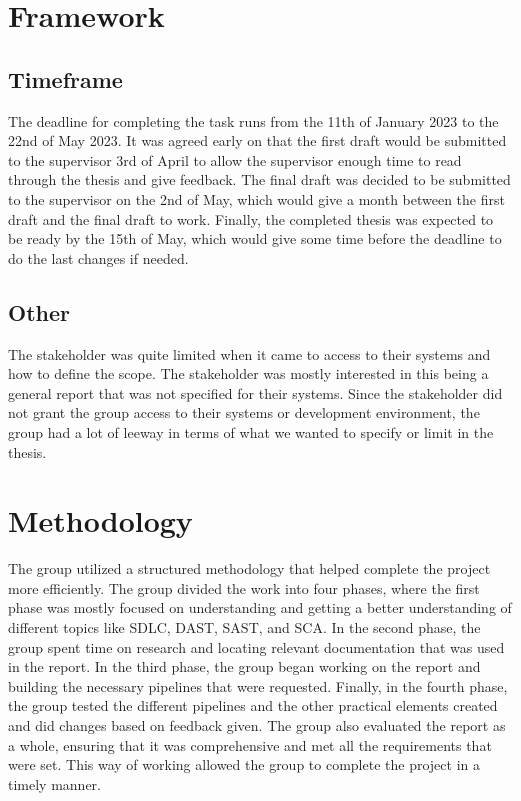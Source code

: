 \newpage
\section{Framework}

\subsection{Timeframe}
The deadline for completing the task runs from the 11th of January 2023 to the 22nd of May 2023. It was agreed early on that the first draft would be submitted to the supervisor 3rd of April to allow the supervisor enough time to read through the thesis and give feedback. The final draft was decided to be submitted to the supervisor on the 2nd of May, which would give a month between the first draft and the final draft to work. Finally, the completed thesis was expected to be ready by the 15th of May, which would give some time before the deadline to do the last changes if needed. 



\subsection{Other}
The stakeholder was quite limited when it came to access to their systems and how to define the scope. The stakeholder was mostly interested in this being a general report that was not specified for their systems. Since the stakeholder did not grant the group access to their systems or development environment, the group had a lot of leeway in terms of what we wanted to specify or limit in the thesis. 


\section{Methodology}
The group utilized a structured methodology that helped complete the project more efficiently. The group divided the work into four phases, where the first phase was mostly focused on understanding and getting a better understanding of different topics like SDLC, DAST, SAST, and SCA. In the second phase, the group spent time on research and locating relevant documentation that was used in the report. In the third phase, the group began working on the report and building the necessary pipelines that were requested. Finally, in the fourth phase, the group tested the different pipelines and the other practical elements created and did changes based on feedback given. The group also evaluated the report as a whole, ensuring that it was comprehensive and met all the requirements that were set. This way of working allowed the group to complete the project in a timely manner. 


